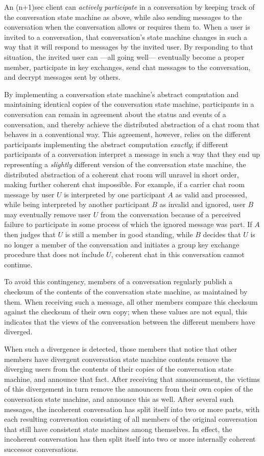 \documentclass{article}
\begin{document}
An (n+1)sec client can \emph{actively participate} in a conversation by keeping track of the conversation state machine as above, while also sending messages to the conversation when the conversation allows or requires them to.
When a user is invited to a conversation, that conversation's state machine changes in such a way that it will respond to messages by the invited user.
By responding to that situation, the invited user can ---all going well--- eventually become a proper member, participate in key exchanges, send chat messages to the conversation, and decrypt messages sent by others.

By implementing a conversation state machine's abstract computation and maintaining identical copies of the conversation state machine, participants in a conversation can remain in agreement about the status and events of a conversation, and thereby achieve the distributed abstraction of a chat room that behaves in a conventional way.
This agreement, however, relies on the different participants implementing the abstract computation \emph{exactly}; if different participants of a conversation interpret a message in such a way that they end up representing a \emph{slightly} different version of the conversation state machine, the distributed abstraction of a coherent chat room will unravel in short order, making further coherent chat impossible.
For example, if a carrier chat room message by user $U$ is interpreted by one participant $A$ as valid and processed, while being interpreted by another participant $B$ as invalid and ignored, user $B$ may eventually remove user $U$ from the conversation because of a perceived failure to participate in some process of which the ignored message was part.
If $A$ then judges that $U$ is still a member in good standing, while $B$ decides that $U$ is no longer a member of the conversation and initiates a group key exchange procedure that does not include $U$, coherent chat in this conversation cannot continue.

To avoid this contingency, members of a conversation regularly publish a checksum of the contents of the conversation state machine, as maintained by them.
When receiving such a message, all other members compare this checksum against the checksum of their own copy; when these values are not equal, this indicates that the views of the conversation between the different members have diverged.

When such a divergence is detected, those members that notice that other members have divergent conversation state machine contents remove the diverging users from the contents of their copies of the conversation state machine, and announce that fact.
After receiving that announcement, the victims of this divergement in turn remove the announcers from their own copies of the conversation state machine, and announce this as well.
After several such messages, the incoherent conversation has split itself into two or more parts, with each resulting conversation consisting of all members of the original conversation that still have consistent state machines among themselves.
In effect, the incoherent conversation has then split itself into two or more internally coherent successor conversations.
\end{document}
